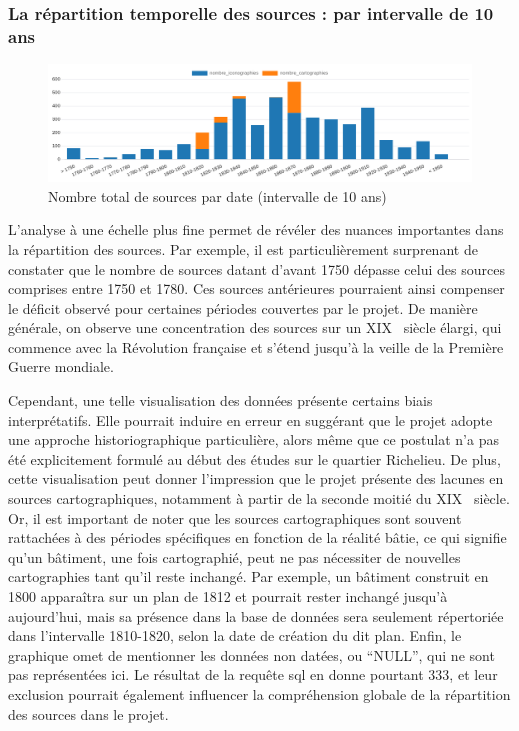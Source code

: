 \subsubsection{La répartition temporelle des sources : par intervalle de 10 ans}
\begin{figure}[ht!]
    \centering
    \includegraphics[width=1\linewidth]{images/graphiques/total_source_date_10.png}
    \caption{Nombre total de sources par date (intervalle de 10 ans)}
    \label{fig:total_sources_date10}
\end{figure}
L'analyse à une échelle plus fine permet de révéler des nuances importantes dans la répartition des sources. Par exemple, il est particulièrement surprenant de constater que le nombre de sources datant d'avant 1750 dépasse celui des sources comprises entre 1750 et 1780. Ces sources antérieures pourraient ainsi compenser le déficit observé pour certaines périodes couvertes par le projet. De manière générale, on observe une concentration des sources sur un XIX\ieme~ siècle élargi, qui commence avec la Révolution française et s'étend jusqu'à la veille de la Première Guerre mondiale.

Cependant, une telle visualisation des données présente certains biais interprétatifs. Elle pourrait induire en erreur en suggérant que le projet adopte une approche historiographique particulière, alors même que ce postulat n'a pas été explicitement formulé au début des études sur le quartier Richelieu. De plus, cette visualisation peut donner l'impression que le projet présente des lacunes en sources cartographiques, notamment à partir de la seconde moitié du XIX\ieme~ siècle. Or, il est important de noter que les sources cartographiques sont souvent rattachées à des périodes spécifiques en fonction de la réalité bâtie, ce qui signifie qu'un bâtiment, une fois cartographié, peut ne pas nécessiter de nouvelles cartographies tant qu'il reste inchangé. Par exemple, un bâtiment construit en 1800 apparaîtra sur un plan de 1812 et pourrait rester inchangé jusqu'à aujourd'hui, mais sa présence dans la base de données sera seulement répertoriée dans l'intervalle 1810-1820, selon la date de création du dit plan. Enfin, le graphique omet de mentionner les données non datées, ou \enquote{NULL}, qui ne sont pas représentées ici. Le résultat de la requête \acrshort{sql} en donne pourtant 333, et leur exclusion pourrait également influencer la compréhension globale de la répartition des sources dans le projet.  

